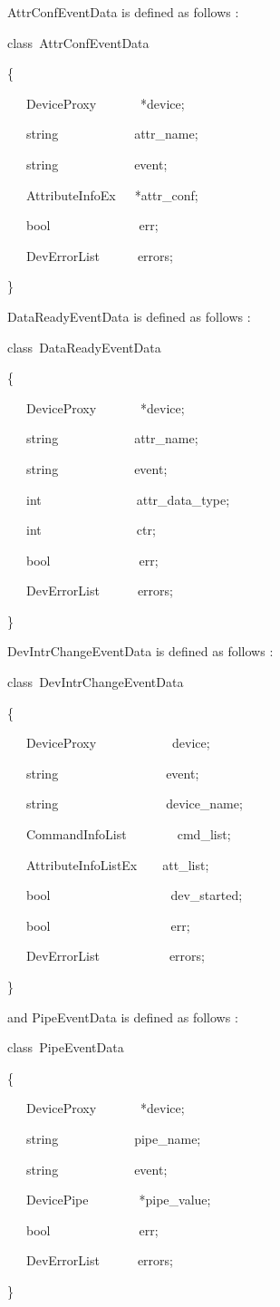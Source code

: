 AttrConfEventData is defined as follows
:
\begin{lyxcode}
class~AttrConfEventData~

\{

~~~DeviceProxy~~~~~~~{*}device;

~~~string~~~~~~~~~~~~attr\_name;

~~~string~~~~~~~~~~~~event;

~~~AttributeInfoEx~~~{*}attr\_conf;

~~~bool~~~~~~~~~~~~~~err;

~~~DevErrorList~~~~~~errors;

\}
\end{lyxcode}
DataReadyEventData is defined as follows
:
\begin{lyxcode}
class~DataReadyEventData~

\{

~~~DeviceProxy~~~~~~~{*}device;

~~~string~~~~~~~~~~~~attr\_name;

~~~string~~~~~~~~~~~~event;

~~~int~~~~~~~~~~~~~~~attr\_data\_type;

~~~int~~~~~~~~~~~~~~~ctr;

~~~bool~~~~~~~~~~~~~~err;

~~~DevErrorList~~~~~~errors;

\}
\end{lyxcode}
DevIntrChangeEventData is defined as
follows :
\begin{lyxcode}
class~DevIntrChangeEventData~

\{

~~~DeviceProxy~~~~~~~~~~~~device;

~~~string~~~~~~~~~~~~~~~~~event;

~~~string~~~~~~~~~~~~~~~~~device\_name;

~~~CommandInfoList~~~~~~~~cmd\_list;

~~~AttributeInfoListEx~~~~att\_list;

~~~bool~~~~~~~~~~~~~~~~~~~dev\_started;

~~~bool~~~~~~~~~~~~~~~~~~~err;

~~~DevErrorList~~~~~~~~~~~errors;

\}
\end{lyxcode}
and PipeEventData is defined as follows :
\begin{lyxcode}
class~PipeEventData~

\{

~~~DeviceProxy~~~~~~~{*}device;

~~~string~~~~~~~~~~~~pipe\_name;

~~~string~~~~~~~~~~~~event;

~~~DevicePipe~~~~~~~~{*}pipe\_value;

~~~bool~~~~~~~~~~~~~~err;

~~~DevErrorList~~~~~~errors;

\}
\end{lyxcode}
